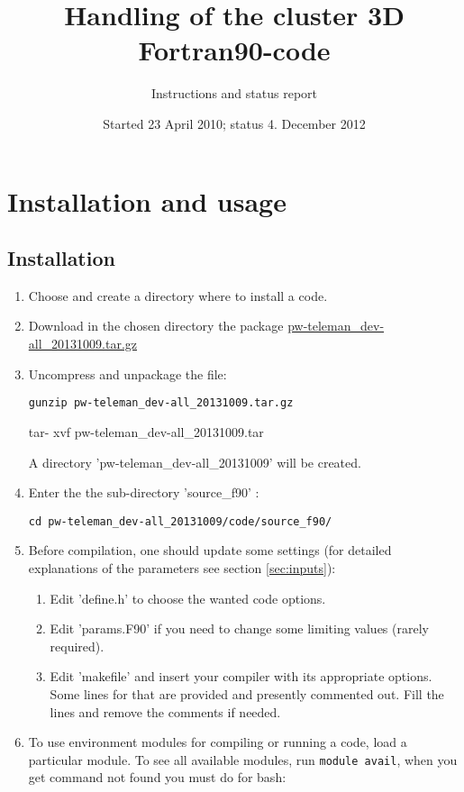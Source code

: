 \documentclass[12pt]{article}
\begin{document}
\title{Handling of the cluster 3D Fortran90-code}
\author{Instructions and status report}
\date{Started 23 April 2010; status 4. December 2012}
\maketitle

\tableofcontents
\newpage

\section{Installation and usage}
\pagestyle{plain}
\subsection{Installation}

\begin{enumerate}
\item Choose and create a directory where to install a code.
\item Download in the chosen directory the package \href{http://redmine.pw-teleman.org/projects/pw-teleman/activity}{pw-teleman\_dev-all\_20131009.tar.gz}  
\item Uncompress and unpackage the file:

\hspace*{1cm}
{\tt gunzip pw-teleman\_dev-all\_20131009.tar.gz

\hspace*{1cm}
tar- xvf pw-teleman\_dev-all\_20131009.tar}

A directory 'pw-teleman\_dev-all\_20131009' will be created.
\item Enter the the sub-directory 'source\_f90' :

\hspace*{1cm}
{\tt cd pw-teleman\_dev-all\_20131009/code/source\_f90/
}

\item Before compilation, one should update some settings
(for detailed explanations of the parameters see section \ref{sec:inputs}):
\begin{enumerate}
\item
 Edit 'define.h' to choose the wanted code options.
\item
 Edit 'params.F90' if you need to change some limiting values
 (rarely required).
\item
 Edit 'makefile' and insert your compiler with its appropriate
 options. Some lines for that are provided and presently commented out.
 Fill the lines and remove the comments if needed.
\end{enumerate}
\item To use environment modules for compiling or running a code, load a particular module. To see all available modules, run {\tt module avail}, when you get command not found you must do for bash:


\end{enumerate}
\end{document}
